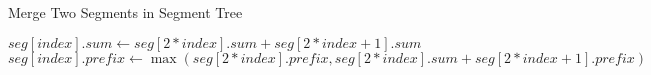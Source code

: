 \begin{algorithm}
    \caption{Merge Two Segments in Segment Tree}
    \begin{algorithmic}[1]
            \State $seg[index].sum \gets seg[2 * index].sum + seg[2 * index + 1].sum$
            \State $seg[index].prefix \gets 
                \max(seg[2 * index].prefix, seg[2 * index].sum + seg[2 * index + 1].prefix)$
        \EndProcedure
    \end{algorithmic}
\end{algorithm}
